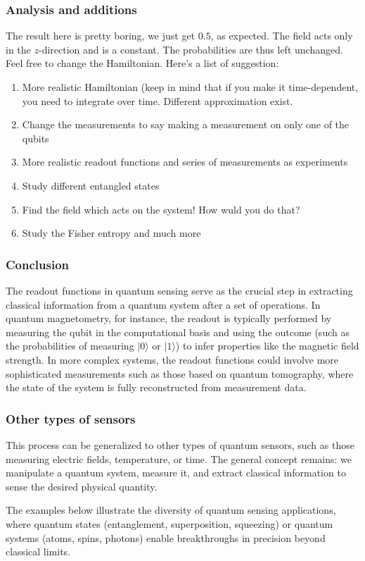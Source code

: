 \documentclass{beamer}
\begin{document}
\begin{frame}
\frametitle{Analysis and additions}

The result here is pretty boring, we just get $0.5$, as expected. The field acts only in the $z$-direction and is a constant. The probabilities are thus left unchanged.
Feel free to change the Hamiltonian. Here's a list of suggestion:
\begin{enumerate}
\item More realistic Hamiltonian (keep in mind that if you make it time-dependent, you need to integrate over time. Different approximation exist.

\item Change the measurements to say making a measurement on only one of the qubits

\item More realistic readout functions and series of measurements as experiments

\item Study different entangled states

\item Find the field which acts on the system! How wuld you do that?

\item Study the Fisher entropy and much more
\end{enumerate}

\noindent
\end{frame}

\begin{frame}
\frametitle{Conclusion}

\begin{block}{}
The readout functions in quantum sensing serve as the crucial step in
extracting classical information from a quantum system after a set of
operations. In quantum magnetometry, for instance, the readout is
typically performed by measuring the qubit in the computational basis
and using the outcome (such as the probabilities of measuring
$\vert 0\rangle$ or $\vert 1\rangle$) to infer properties like the magnetic field
strength. In more complex systems, the readout functions could involve
more sophisticated measurements such as those based on quantum
tomography, where the state of the system is fully reconstructed from
measurement data.
\end{block}
\end{frame}

\begin{frame}
\frametitle{Other types of sensors}

This process can be generalized to other types of quantum sensors,
such as those measuring electric fields, temperature, or time. The
general concept remains: we manipulate a quantum system, measure it,
and extract classical information to sense the desired physical
quantity.

The examples below illustrate the diversity of quantum sensing
applications, where quantum states (entanglement, superposition,
squeezing) or quantum systems (atoms, spins, photons) enable
breakthroughs in precision beyond classical limits.
\end{frame}
\end{document}
